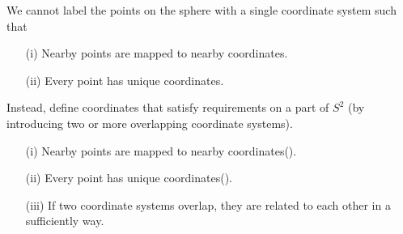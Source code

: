 \documentclass[a4paper, 10pt]{article}
\begin{document}
\begin{obs}
    We cannot label the points on the sphere with a single coordinate system such that
    \begin{itemize}
        \item[(i)] Nearby points are mapped to nearby coordinates.
        \item[(ii)] Every point has unique coordinates.
    \end{itemize}
    Instead, define coordinates that satisfy requirements on a part of $S^{2}$ (by introducing two or more overlapping coordinate systems).
    \begin{itemize}
        \item[(i)] Nearby points are mapped to nearby coordinates().
        \item[(ii)] Every point has unique coordinates().
        \item[(iii)] If two coordinate systems overlap, they are related to each other in a sufficiently  way.
    \end{itemize}
\end{obs}
\end{document}
